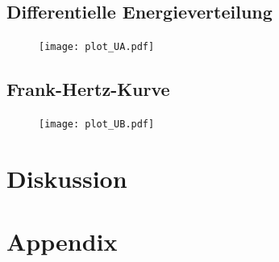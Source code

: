 \subsection{Differentielle Energieverteilung}

\begin{figure}[H]
    \centering
    \texttt{[image: plot\_UA.pdf]}
    \caption{} %
    \label{fig:5} 
\end{figure}

\subsection{Frank-Hertz-Kurve}

\begin{figure}[H]
    \centering
    \texttt{[image: plot\_UB.pdf]}
    \caption{} %
    \label{fig:6} 
\end{figure}


\section{Diskussion}



\newpage
\printbibliography
\newpage
\section*{Appendix}


